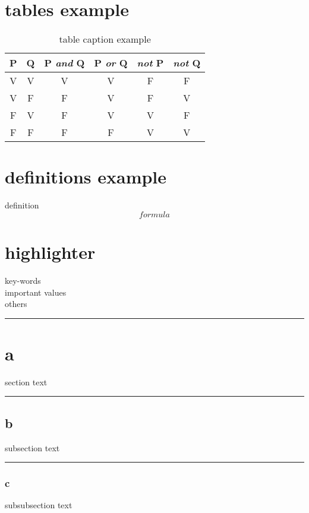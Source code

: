 \documentclass[12pt]{article}
\begin{document}
\section{tables example}

\vspace{20px}
\begin{tcolorbox}[colback=green!10!white]
\begin{table}[H]
    \centering

    \begin{tabular}{c|c|c|c|c|c} 
         \:\:\textbf{P}\:\: & \:\:\textbf{Q}\:\: & \textbf{P} \textit{and} \textbf{Q} & \textbf{P} \textit{or} \textbf{Q} & \textit{not} \textbf{P} & \textit{not} \textbf{Q} \\\hline
         V & V & V & V & F & F \\
         V & F & F & V & F & V \\
         F & V & F & V & V & F \\
         F & F & F & F & V & V 
    \end{tabular}
    \caption*{table caption example}
\end{table}
\end{tcolorbox}
\vspace{20px}


\section{definitions example}

\vspace{20px}
\begin{tcolorbox}[title=Title., colframe=red!45!black, colback=red!5!white]
definition
\tcblower
\begin{equation}\nonumber
    formula
\end{equation}
\end{tcolorbox}
\vspace{20px}

\section{highlighter}
\colorbox{blue!20!white}{key-words}\\
\colorbox{red!20!white}{important values}\\
\colorbox{green!20!white}{others}


\newpage
\vspace{50px}
\par\noindent\rule{\textwidth}{0.8pt}
\section{a}
section text

\vspace{40px}
\par\noindent\rule{\textwidth}{0.2pt}
\subsection{b}
subsection text

\vspace{20px}
\par\noindent\rule{\textwidth}{0.2pt}
\subsubsection{c}
subsubsection text
\end{document}
